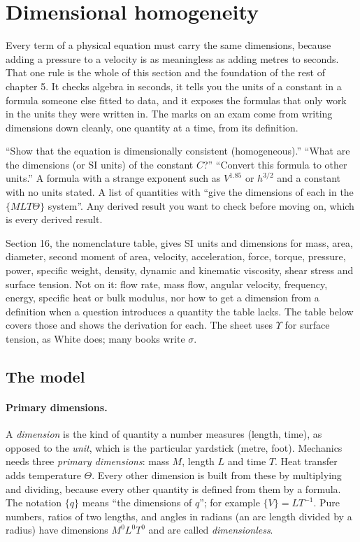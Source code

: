 \section{Dimensional homogeneity}
\label{sec:homogeneity}

Every term of a physical equation must carry the same dimensions, because adding a pressure to a velocity is as meaningless as adding metres to seconds. That one rule is the whole of this section and the foundation of the rest of chapter 5. It checks algebra in seconds, it tells you the units of a constant in a formula someone else fitted to data, and it exposes the formulas that only work in the units they were written in. The marks on an exam come from writing dimensions down cleanly, one quantity at a time, from its definition.

\begin{recognise}
``Show that the equation is dimensionally consistent (homogeneous).'' ``What are the dimensions (or SI units) of the constant $C$?'' ``Convert this formula to other units.'' A formula with a strange exponent such as $V^{1.85}$ or $h^{3/2}$ and a constant with no units stated. A list of quantities with ``give the dimensions of each in the $\{MLT\Theta\}$ system''. Any derived result you want to check before moving on, which is every derived result.
\end{recognise}

\begin{onsheet}
Section 16, the nomenclature table, gives SI units and dimensions for mass, area, diameter, second moment of area, velocity, acceleration, force, torque, pressure, power, specific weight, density, dynamic and kinematic viscosity, shear stress and surface tension. Not on it: flow rate, mass flow, angular velocity, frequency, energy, specific heat or bulk modulus, nor how to get a dimension from a definition when a question introduces a quantity the table lacks. The table below covers those and shows the derivation for each. The sheet uses $\Upsilon$ for surface tension, as White does; many books write $\sigma$.
\end{onsheet}

\subsection*{The model}

\paragraph{Primary dimensions.} A \emph{dimension} is the kind of quantity a number measures (length, time), as opposed to the \emph{unit}, which is the particular yardstick (metre, foot). Mechanics needs three \emph{primary dimensions}: mass $M$, length $L$ and time $T$. Heat transfer adds temperature $\Theta$. Every other dimension is built from these by multiplying and dividing, because every other quantity is defined from them by a formula. The notation $\{q\}$ means ``the dimensions of $q$''; for example $\{V\} = LT^{-1}$. Pure numbers, ratios of two lengths, and angles in radians (an arc length divided by a radius) have dimensions $M^0L^0T^0$ and are called \emph{dimensionless}.

